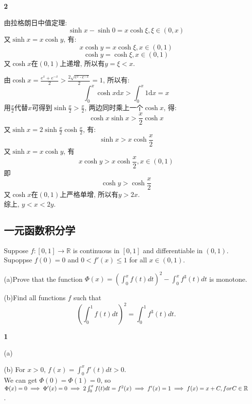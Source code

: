 \documentclass[12pt]{article}
\newenvironment{solution}[2][Solution]{\begin{trivlist}
\item[\hskip \labelsep {\bfseries #1}]}{\end{trivlist}}
\newenvironment{problem}[2][Problem]{\begin{trivlist}
\item[\hskip \labelsep {\bfseries #1}\hskip \labelsep {\bfseries #2.}]}{\end{trivlist}}
\begin{document}
\begin{solution}{2} \textbf{2}

    由拉格朗日中值定理:
    \[
        \sinh x - \sinh 0 = x\cosh \xi , \xi\in \left(0, x\right)    
    \]    
    又$\sinh x = x\cosh y $, 有:
    \[
        x\cosh y = x\cosh \xi , x\in\left(0, 1\right)
    \]
    \[
        \cosh y = \cosh \xi , x\in\left(0, 1\right)
    \]
    又$\cosh x$在$\left(0, 1\right)$上递增, 所以有$y = \xi < x$.

    由$\displaystyle\cosh x = \frac{e^x + e^{-x}}{2} > \frac{2\sqrt{e^x\cdot e^{-x}}}{2} = 1$, 所以有:
    \[
        \int_0^x \cosh x \mathrm{d}x > \int_0^x 1\mathrm{d}x = x
    \]
    用$\displaystyle\frac{x}{2}$代替$x$可得到$\displaystyle\sinh \frac{x}{2} > \frac{x}{2}$, 两边同时乘上一个$\cosh x$, 得:
    \[
        \cosh x \sinh x > \frac{x}{2}\cosh x    
    \]
    又$\sinh x = 2\sinh \frac{x}{2}\cosh\frac{x}{2}$, 有:
    \[
        \sinh x > x\cosh \frac{x}{2}     
    \]
    又$\sinh x = x\cosh y$, 有
    \[
         x\cosh y > x\cosh \frac{x}{2}, x\in\left(0, 1\right)  
    \]
    即
    \[
        \cosh y > \cosh \frac{x}{2}
    \]
    又$\cosh x$在$\left(0, 1\right)$上严格单增, 所以有$y>2x$.\\
    综上, $y<x<2y$.
\end{solution}


\pagebreak









\subsection{一元函数积分学}

\begin{problem}{1}

    Suppose $ f: [0, 1] \to \mathbb{R} $ is continuous in $[0,1]$ and differentiable in $(0,1)$. Supoppse $f(0) = 0$ and 
    $0<f'(x)\leq 1$ for all $x \in (0,1)$. 
    \item (a)Prove that the function $\displaystyle\Phi (x) = (\int_{0}^{x} f(t)dt)^2 - \int_{0}^{x} f^3(t)dt$ is monotone.
    \item (b)Find all functions $f$ such that
        \[
            (\int_{0}^{1} f(t) dt)^2 = \int_{0}^{1} f^3(t) dt.
        \]
    
\end{problem}


\begin{solution}{1} \textbf{1}

    \item (a) 
    \item (b) For $x>0$, $f(x) = \int_{0}^{x} f'(t)dt > 0$. \\
        We can get $\Phi(0) = \Phi(1) = 0$, so $\Phi(x) = 0 \implies \Phi'(x) = 0 \implies 2\int_{0}^{x}f(t)dt = f^2 (x) \\
        \implies f'(x) = 1 \implies f(x) = x + C, for C \in \mathbb{R} $.
    
\end{solution}
\end{document}
